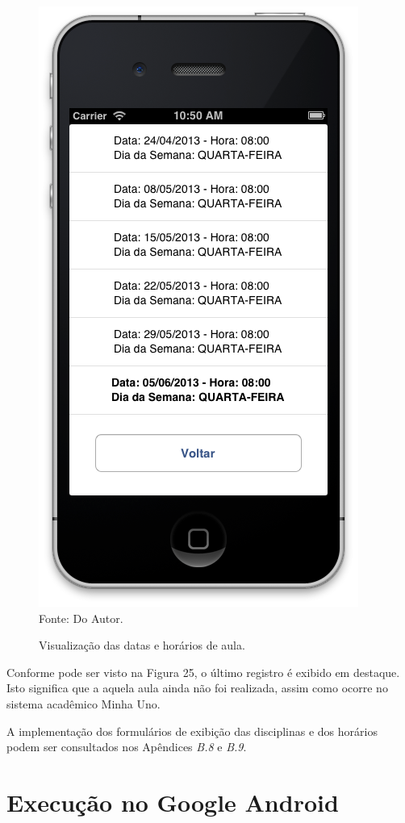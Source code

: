 \begin{figure}[!htb]
     \centering
     \caption[Formulário Horários do Semestre - Visualização dos Horários]{Visualização das datas e horários de aula.}
     \includegraphics[scale=0.34]{imagens/formconsultahorariosemestredisciplina.png}
     \\  Fonte: Do Autor.
\end{figure}
\newpage

Conforme pode ser visto na Figura 25, o último registro é exibido em destaque. Isto significa que a aquela aula ainda não foi realizada, assim como ocorre no sistema acadêmico Minha Uno.

A implementação dos formulários de exibição das disciplinas e dos horários podem ser consultados nos Apêndices \emph{B.8} e \emph{B.9}.

\section{Execução no Google Android}
